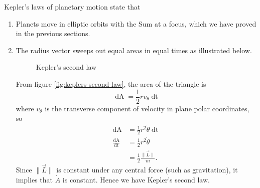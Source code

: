 Kepler's laws of planetary motion state that
\begin{enumerate}
    \item Planets move in elliptic orbits with the Sum at a focus, which we have proved in the previous sections.
    \item The radius vector sweeps out equal areas in equal times as illustrated below.
    
    \begin{figure}[h!]
        \centering
        \def\orbit{(1.5,0) ellipse(2.5cm and 2cm)}
        \caption{Kepler's second law}
    \end{figure}
    \FloatBarrier
    
    From figure \ref{fig:keplers-second-law}, the area of the triangle is
    \begin{equation}
        \mathop{\mathrm{d}A} = \frac{1}{2} r v_{\theta} \mathop{\mathrm{d}t}
    \end{equation}
    where $v_{\theta}$ is the transverse component of velocity in plane polar coordinates, so
    \begin{align}
        \mathop{\mathrm{d}A} &= \frac{1}{2} r^2 \dot{\theta} \mathop{\mathrm{d}t} \\
        \frac{\mathop{\mathrm{d}A}}{\mathop{\mathrm{d}t}} &= \frac{1}{2} r^2 \dot{\theta} \\
        &= \frac{1}{2} \frac{\| \vec{L} \|}{m}.
    \end{align}
    Since $\| \vec{L} \|$ is constant under any central force (such as gravitation), it implies that $\dot{A}$ is constant. Hence we have Kepler's second law.
    

\end{enumerate}
